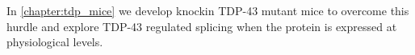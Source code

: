 %
In \autoref{chapter:tdp_mice} we develop knockin TDP-43 mutant mice to overcome this hurdle and explore TDP-43 regulated splicing when the protein is expressed at physiological levels.







